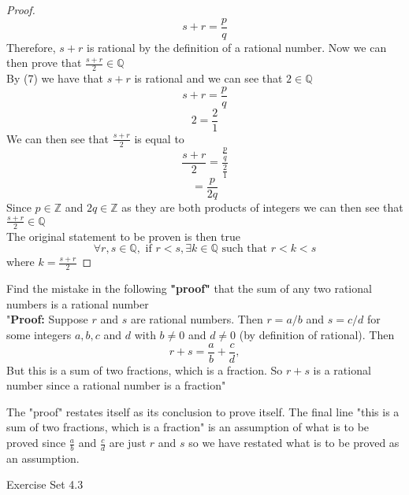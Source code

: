 \documentclass[12pt,letterpaper, onecolumn]{exam}
\begin{document}
\begin{questions}
\begin{solution}
\begin{proof}
				\[s+r=\frac{p}{q}\tag{7}\]
				Therefore, $s+r$ is rational by the definition of a rational number.
				Now we can then prove that $\frac{s+r}{2} \in \mathbb{Q}$\\
				By (7) we have that $s+r$ is rational and we can see that $2 \in \mathbb{Q}$
				$$s+r=\frac{p}{q}$$
				$$2=\frac{2}{1}$$
				We can then see that $\frac{s+r}{2}$ is equal to 
				$$\frac{s+r}{2}=\frac{\frac{p}{q}}{\frac{2}{1}}$$
				$$=\frac{p}{2q}$$
				Since $p \in \mathbb{Z}$ and $2q \in \mathbb{Z}$ as they are both products of integers we can then see that $\frac{s+r}{2}\in \mathbb{Q}$\\
				The original statement to be proven is then true 
				$$\forall r,s \in \mathbb{Q}, \textrm{ if } r<s, \exists k \in \mathbb{Q} \textrm{ such that } r<k<s$$
				where $k=\frac{s+r}{2}$
			\end{proof}
		\end{solution}
		\pagebreak
		\setcounter{question}{37} \question   Find the mistake in the following \textbf{"proof"} that the sum of any two rational numbers is a rational number\\
		
		"\textbf{Proof:} Suppose $r$ and $s$ are rational numbers. Then $r=a/b$ and $s=c/d$ for some integers $a, b, c$ and $d$ with $b \neq 0$ and $d \neq 0$ (by definition of rational). Then $$r+s=\frac{a}{b}+\frac{c}{d},$$ But this is a sum of two fractions, which is a fraction. So $r+s$ is a rational number since a rational number is a fraction"\\ 
		
		\begin{solution}
			The "proof" restates itself as its conclusion to prove itself. The final line "this is a sum of two fractions, which is a fraction" is an assumption of what is to be proved since $\frac{a}{b}$ and $\frac{c}{d}$ are just $r$ and $s$ so we have restated what is to be proved as an assumption.
		\end{solution}
	\end{questions}
	\centering\large Exercise Set 4.3
\end{document}
